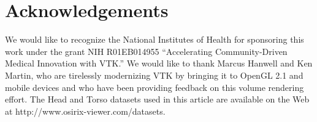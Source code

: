 \section{Acknowledgements}
We would like to recognize the National Institutes of Health for sponsoring this work under the grant NIH R01EB014955 “Accelerating Community-Driven Medical Innovation with VTK.” We would like to thank Marcus Hanwell and Ken Martin, who are tirelessly modernizing VTK by bringing it to OpenGL 2.1 and mobile devices and who have been providing feedback on this volume rendering effort.
The Head and Torso datasets used in this article are available on the Web at http://www.osirix-viewer.com/datasets.